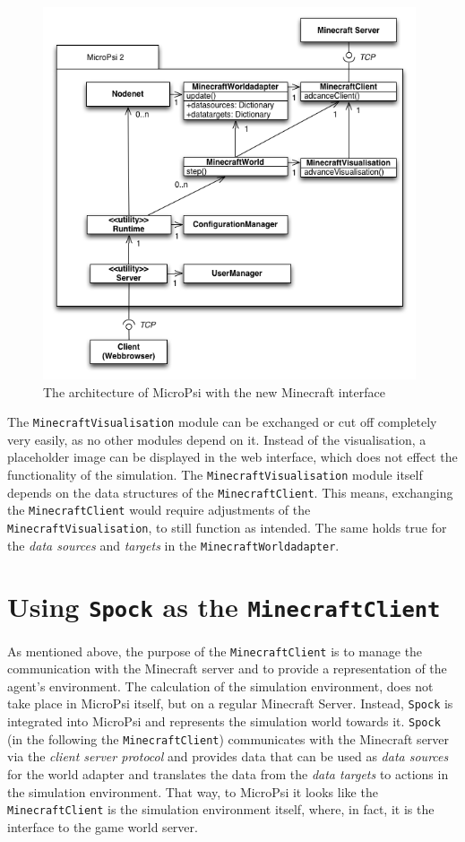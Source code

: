 \begin{figure}[h]
  \centering
    \includegraphics[width=11cm]{graphics/UML_MicroPsi_mit_spock_v15}
  \caption{The architecture of MicroPsi with the new Minecraft interface}
  \label{uml_mc}
\end{figure}

The \texttt{MinecraftVisualisation} module can be exchanged or cut off completely very easily, as no other modules depend on it. Instead of the visualisation, a placeholder image can be displayed in the web interface, which does not effect the functionality of the simulation. The \texttt{MinecraftVisualisation} module itself depends on the data structures of the \texttt{MinecraftClient}. This means, exchanging the \texttt{MinecraftClient} would require adjustments of the \texttt{MinecraftVisualisation}, to still function as intended. The same holds true for the \emph{data sources} and \emph{targets} in the \texttt{MinecraftWorldadapter}.

    \section{Using \texttt{Spock} as the \texttt{MinecraftClient}}

As mentioned above, the purpose of the \texttt{MinecraftClient} is to manage the communication with the Minecraft server and to provide a representation of the agent's environment. The calculation of the simulation environment, does not take place in MicroPsi itself, but on a regular Minecraft Server. Instead, \texttt{Spock} is integrated into MicroPsi and represents the simulation world towards it. \texttt{Spock} (in the following the \texttt{MinecraftClient}) communicates with the Minecraft server via the \emph{client server protocol} and provides data that can be used as \emph{data sources} for the world adapter and translates the data from the \emph{data targets} to actions in the simulation environment. That way, to MicroPsi it looks like the \texttt{MinecraftClient} is the simulation environment itself, where, in fact, it is the interface to the game world server.

